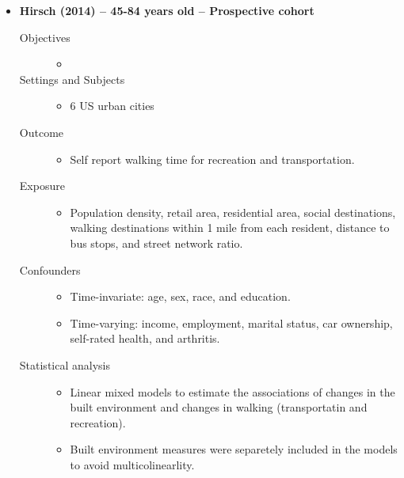 \documentclass{article}
\begin{document}
\begin{itemize}
	\item{\bf Hirsch (2014) -- 45-84 years old -- Prospective cohort} 
		\begin{description}
			\item[Objectives] \mbox{}\par
				\begin{itemize}
					\item 
				\end{itemize}
			\item[Settings and Subjects] \mbox{}\par
				\begin{itemize}
					\item 6 US urban cities
				\end{itemize}
			\item[Outcome]\mbox{}\par
				\begin{itemize}
					\item Self report walking time for recreation and transportation.
				\end{itemize}
			\item[Exposure]\mbox{}\par
				\begin{itemize}
					\item Population density, retail area, residential area, social destinations, walking destinations within 1 mile from each resident, distance to bus stops, and street network ratio.
				\end{itemize}
			\item[Confounders] \mbox{}\par
				\begin{itemize}
					\item Time-invariate: age, sex, race, and education. 
					\item Time-varying: income, employment, marital status, car ownership, self-rated health, and arthritis. 
				\end{itemize}
			\item[Statistical analysis] \mbox{}\par
				\begin{itemize}
					\item Linear mixed models to estimate the associations of changes in the built environment and changes in walking (transportatin and recreation). 
					\item Built environment measures were separetely included in the models to avoid multicolinearlity.

\end{itemize}
\end{description}
\end{itemize}
\end{document}
